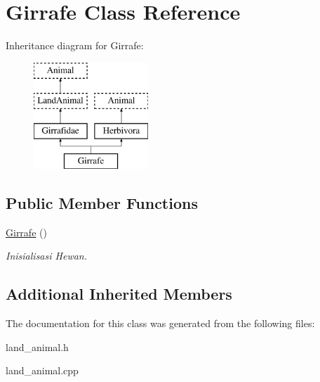 \hypertarget{class_girrafe}{}\section{Girrafe Class Reference}
\label{class_girrafe}
Inheritance diagram for Girrafe\+:\begin{figure}[H]
\begin{center}
\leavevmode
\includegraphics[height=4.000000cm]{class_girrafe}
\end{center}
\end{figure}
\subsection*{Public Member Functions}
\begin{DoxyCompactItemize}
\item 
\hyperlink{class_girrafe_a2f0f0d978d40addd7acb4c14f0080087}{Girrafe} ()\hypertarget{class_girrafe_a2f0f0d978d40addd7acb4c14f0080087}{}\label{class_girrafe_a2f0f0d978d40addd7acb4c14f0080087}

\begin{DoxyCompactList}\small\item\em Inisialisasi Hewan. \end{DoxyCompactList}\end{DoxyCompactItemize}
\subsection*{Additional Inherited Members}


The documentation for this class was generated from the following files\+:\begin{DoxyCompactItemize}
\item 
land\+\_\+animal.\+h\item 
land\+\_\+animal.\+cpp\end{DoxyCompactItemize}
